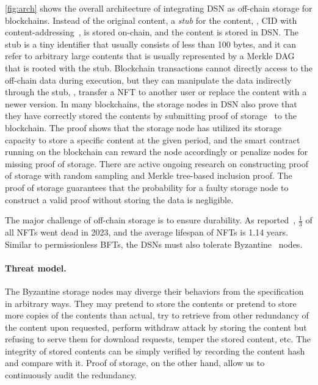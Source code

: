 \autoref{fig:arch} shows the overall architecture of integrating DSN as off-chain storage for blockchains.
Instead of the original content, a \emph{stub} for the content, \eg, CID with content-addressing~\cite{benet2014ipfs}, is stored on-chain, and the content is stored in DSN.
The stub is a tiny identifier that usually consists of less than 100 bytes, and it can refer to arbitrary large contents that is usually represented by a Merkle DAG~\cite{benet2014ipfs} that is rooted with the stub.
Blockchain transactions cannot directly access to the off-chain data during execution, but they can manipulate the data indirectly through the stub, \eg, transfer a NFT to another user or replace the content with a newer version.
In many blockchains, the storage nodes in DSN also prove that they have correctly stored the contents by submitting proof of storage~\cite{fisch2018scaling} to the blockchain.
The proof shows that the storage node has utilized its storage capacity to store a specific content at the given period, and the smart contract running on the blockchain can reward the node accordingly or penalize nodes for missing proof of storage.
There are active ongoing research on constructing proof of storage \eg with random sampling and Merkle tree-based inclusion proof.
The proof of storage guarantees that the probability for a faulty storage node to construct a valid proof without storing the data is negligible.

The major challenge of off-chain storage is to ensure durability.
As reported~\cite{nft-storage}, $\frac{1}{3}$ of all NFTs went dead in 2023, and the average lifespan of NFTs is 1.14 years.
Similar to permissionless BFTs, the DSNs must also tolerate Byzantine~\cite{bgp} nodes.

\paragraph{Threat model.}
The Byzantine storage nodes may diverge their behaviors from the specification in arbitrary ways.
They may pretend to store the contents or pretend to store more copies of the contents than actual, try to retrieve from other redundancy of the content upon requested, perform withdraw attack by storing the content but refusing to serve them for download requests, temper the stored content, etc.
The integrity of stored contents can be simply verified by recording the content hash and compare with it.
Proof of storage, on the other hand, allow us to continuously audit the redundancy.

